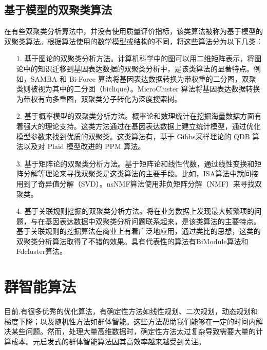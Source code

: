   \subsection{基于模型的双聚类算法}
  在有些双聚类分析算法中，并没有使用质量评价指标，该类算法被称为基于模型的双聚类算法。根据算法使用的数学模型或结构的不同，将这些算法分为以下几类：
  \begin{enumerate}
    \item[1.]基于图论的双聚类分析方法。计算机科学中的图可以用二维矩阵表示，将图论中的知识迁移到基因表达数据的双聚类分析中，是该类算法的显著特点。例如，SAMBA 和 Bi-Force 算法将基因表达数据转换为带权重的二分图，双聚类则被视为其中的二分团（biclique）。MicroCluster 算法将基因表达数据转换为带权有向多重图，双聚类分子转化为深度搜索树。

    \item[2.]基于概率模型的双聚类分析方法。概率论和数理统计在挖掘海量数据方面有着强大的理论支持。这类方法通过在基因表达数据上建立统计模型，通过优化模型参数来找到优质的双聚类。这类算法有，基于 Gibbs采样理论的 QDB 算法以及对 Plaid 模型改进的 PPM 算法。
    
    \item[3.]基于矩阵论的双聚类分析方法。基于矩阵论和线性代数，通过线性变换和矩阵分解等理论来寻找双聚类是这类算法的主要手段。比如，ISA算法中就间接用到了奇异值分解（SVD）。nsNMF算法使用非负矩阵分解（NMF）来寻找双聚类。
    
    \item[4.]基于关联规则挖掘的双聚类分析方法。将在业务数据上发现最大频繁项的问题，与在基因表达数据中双聚类分析问题联系起来，是该类算法的主要特点。基于关联规则的挖掘算法在商业上有着广泛地应用，通过类比的思想，这类的双聚类分析算法取得了不错的效果。具有代表性的算法有BiModule算法和Fdcluster算法。
    
  \end{enumerate}

\section{群智能算法}
目前,有很多优秀的优化算法，有确定性方法如线性规划、二次规划，动态规划和梯度下降；以及随机性方法如群体智能。这些方法帮助我们能够在一定的时间内解决某些问题。然而，处理大量高维数据时，确定性方法太过复杂导致需要大量的计算成本。元启发式的群体智能算法因其高效率越来越受到关注。

